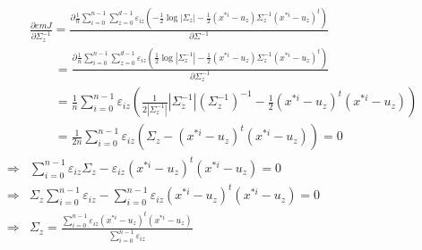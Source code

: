 \documentclass[runningheads,openany]{xhlPaper}
\begin{document}
\begin{equation}
\label{equ:pmmGMMSigma}
\begin{aligned}
&\frac{{\partial emJ}}{{\partial {\Sigma_{z} ^{ - 1}}}} = \frac{{\partial \frac{1}{n}\sum\limits_{i = 0}^{n - 1} {\sum\limits_{z = 0}^{d - 1} {{\varepsilon _{iz}}\left( { - \frac{1}{2}\log |\Sigma_{z} | - \frac{1}{2}\left( {{x^{*i}} - {u_z}} \right){\Sigma_{z} ^{ - 1}}{{\left( {{x^{*i}} - {u_z}} \right)}^t}} \right)} } }}{{\partial {\Sigma ^{ - 1}}}}\\
&\quad\quad = \frac{{\partial \frac{1}{n}\sum\limits_{i = 0}^{n - 1} {\sum\limits_{z = 0}^{d - 1} {{\varepsilon _{iz}}\left( {\frac{1}{2}\log |{\Sigma_{z} ^{ - 1}}| - \frac{1}{2}\left( {{x^{*i}} - {u_z}} \right){\Sigma_{z} ^{ - 1}}{{\left( {{x^{*i}} - {u_z}} \right)}^t}} \right)} } }}{{\partial {\Sigma_{z} ^{ - 1}}}}\\
&\quad\quad = \frac{1}{n}\sum\limits_{i = 0}^{n - 1} {{\varepsilon _{iz}}\left( {\frac{1}{{2|{\Sigma_{z} ^{ - 1}}|}}|{\Sigma_{z} ^{ - 1}}|{{\left( {{\Sigma_{z} ^{ - 1}}} \right)}^{ - 1}} - \frac{1}{2}{{\left( {{x^{*i}} - {u_z}} \right)}^t}\left( {{x^{*i}} - {u_z}} \right)} \right)} \\
&\quad\quad = \frac{1}{{2n}}\sum\limits_{i = 0}^{n - 1} {{\varepsilon _{iz}}\left( {\Sigma_{z}  - {{\left( {{x^{*i}} - {u_z}} \right)}^t}\left( {{x^{*i}} - {u_z}} \right)} \right)}  = 0\\
 \Rightarrow& \sum\limits_{i = 0}^{n - 1} {{\varepsilon _{iz}}\Sigma_{z}  - {\varepsilon _{iz}}{{\left( {{x^{*i}} - {u_z}} \right)}^t}\left( {{x^{*i}} - {u_z}} \right)}  = 0\\
 \Rightarrow& \Sigma_{z} \sum\limits_{i = 0}^{n - 1} {{\varepsilon _{iz}}}  - \sum\limits_{i = 0}^{n - 1} {{\varepsilon _{iz}}{{\left( {{x^{*i}} - {u_z}} \right)}^t}\left( {{x^{*i}} - {u_z}} \right)}  = 0\\
 \Rightarrow& \Sigma_{z}  = \frac{{\sum\limits_{i = 0}^{n - 1} {{\varepsilon _{iz}}{{\left( {{x^{*i}} - {u_z}} \right)}^t}\left( {{x^{*i}} - {u_z}} \right)} }}{{\sum\limits_{i = 0}^{n - 1} {{\varepsilon _{iz}}} }}
\end{aligned}
\end{equation}
\end{document}
